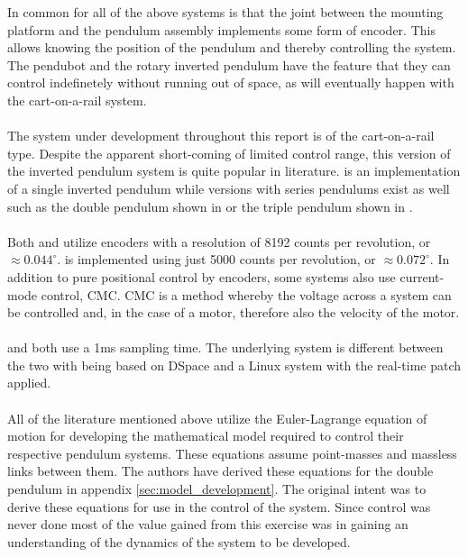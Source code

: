 In common for all of the above systems is that the joint between the mounting platform and the pendulum assembly implements some form of encoder.
This allows knowing the position of the pendulum and thereby controlling the system.
The pendubot and the rotary inverted pendulum have the feature that they can control indefinetely without running out of space, as will eventually happen with the cart-on-a-rail system.
\\~\\
The system under development throughout this report is of the cart-on-a-rail type.
Despite the apparent short-coming of limited control range, this version of the inverted pendulum system is quite popular in literature.
\cite{invertpendulum3} is an implementation of a single inverted pendulum while versions with series pendulums exist as well such as the double pendulum shown in \cite{doubleinvertpendulum} or the triple pendulum shown in \cite{tripleinvertpendulum}.
\\~\\
Both \cite{doubleinvertpendulum} and \cite{tripleinvertpendulum} utilize encoders with a resolution of 8192 counts per revolution, or $\approx 0.044^\circ$.
\cite{invertpendulum3} is implemented using just 5000 counts per revolution, or $\approx 0.072^\circ$.
In addition to pure positional control by encoders, some systems \cite{invertpendulum1} also use current-mode control, CMC.
CMC is a method whereby the voltage across a system can be controlled and, in the case of a motor, therefore also the velocity of the motor.
\\~\\
\cite{doubleinvertpendulum} and \cite{tripleinvertpendulum} both use a 1ms sampling time.
The underlying system is different between the two with \cite{tripleinvertpendulum} being based on DSpace and \cite{doubleinvertpendulum} a Linux system with the real-time patch applied.
\\~\\
All of the literature mentioned above utilize the Euler-Lagrange equation of motion for developing the mathematical model required to control their respective pendulum systems. 
These equations assume point-masses and massless links between them.
The authors have derived these equations for the double pendulum in appendix \ref{sec:model_development}.
The original intent was to derive these equations for use in the control of the system.
Since control was never done most of the value gained from this exercise was in gaining an understanding of the dynamics of the system to be developed.

